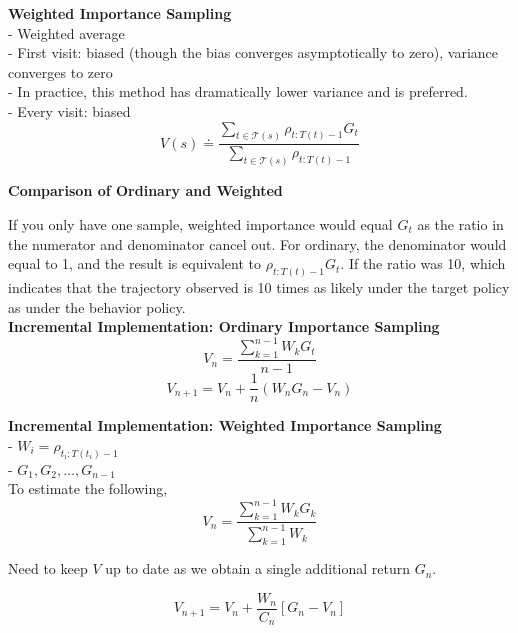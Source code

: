 \documentclass{article}
\begin{document}
\noindent
\textbf{Weighted Importance Sampling}\\
- Weighted average\\
- First visit: biased (though the bias converges asymptotically to zero), variance converges to zero\\
- In practice, this method has dramatically lower variance and is preferred.\\
- Every visit: biased
\begin{equation}
V(s) \doteq \frac{\sum_{t \in \mathcal{T}(s)} \rho_{t: T(t)-1} G_{t}}{\sum_{t \in \mathcal{T}(s)} \rho_{t: T(t)-1}}
\end{equation}

\noindent
\textbf{Comparison of Ordinary and Weighted}

\noindent
If you only have one sample, weighted importance would equal $G_{t}$ as the
ratio in the numerator and denominator cancel out. For ordinary, the denominator
would equal to 1, and the result is equivalent to $\rho_{t: T(t)-1} G_{t}$. If
the ratio was 10, which indicates that the trajectory observed is 10 times as
likely under the target policy as under the behavior policy.\\

\noindent
\textbf{Incremental Implementation: Ordinary Importance Sampling}
\begin{equation}
V_{n}=\frac{\sum_{k=1}^{n-1} W_{k} G_{t}}{n-1}
\end{equation}
\begin{equation}
V_{n+1}=V_{n}+\frac{1}{n}\left(W_{n} G_{n}-V_{n}\right)
\end{equation}

\noindent
\textbf{Incremental Implementation: Weighted Importance Sampling}\\
- $W_{i}=\rho_{t_{i}: T\left(t_{i}\right)-1}$\\
- $G_{1}, G_{2}, \dots, G_{n-1}$\\

\noindent
To estimate the following, 
\begin{equation}
V_{n}=\frac{\sum_{k=1}^{n-1} W_{k} G_{k}}{\sum_{k=1}^{n-1} W_{k}}
\end{equation}

\noindent
Need to keep $V$ up to date as we obtain a single additional return $G_{n}$.

\begin{equation}
V_{n+1}=V_{n}+\frac{W_{n}}{C_{n}}\left[G_{n}-V_{n}\right]
\end{equation}
\end{document}
